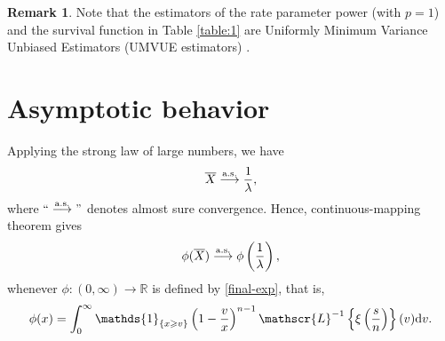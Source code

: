 \documentclass[12pt]{article}
\theoremstyle{definition}
\newtheorem{remark}[theorem]{Remark}
\begin{document}
\begin{remark}
	Note that the estimators of the rate parameter power (with $p=1$) and the survival function in Table \ref{table:1} are Uniformly Minimum Variance Unbiased Estimators (UMVUE estimators) \citep[see Example 35, p. 328, in][]{Mood1913}.
\end{remark}







\section{Asymptotic behavior}


Applying the strong law of large numbers, we have
\begin{align*}
	\overline{X}\stackrel{\rm a.s.}{\longrightarrow} {1\over\lambda},
\end{align*}
where $``\stackrel{\rm a.s.}{\longrightarrow}"$ denotes almost sure convergence. Hence, continuous-mapping
theorem gives
\begin{align}\label{strong-convergence}
	\phi(\overline{X})\stackrel{\rm a.s.}{\longrightarrow}  \phi\left({1\over\lambda}\right),
\end{align}
whenever $\phi:(0,\infty)\to\mathbb{R}$ is defined by \eqref{final-exp}, that is,
\begin{align*} 
	\phi(x)
	=
	\int_0^{\infty} 
	\mathds{1}_{\{x\geqslant v\}}
	\left(1-{v\over x}\right)^{n-1} 
	\mathscr{L}^{-1}\left\{\xi\left({s\over n}\right)
	\right\}(v){\rm d}v.
\end{align*}
\end{document}
